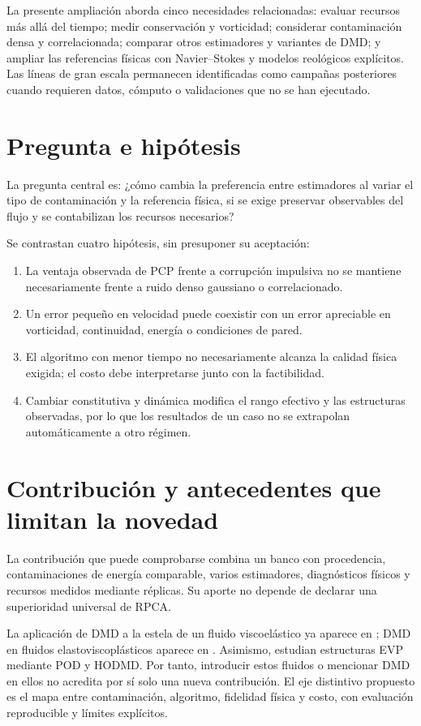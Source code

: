 \documentclass[11pt,oneside,openany]{book}
\begin{document}
La presente ampliación aborda cinco necesidades relacionadas: evaluar
recursos más allá del tiempo; medir conservación y vorticidad; considerar
contaminación densa y correlacionada; comparar otros estimadores y variantes
de DMD; y ampliar las referencias físicas con Navier--Stokes y modelos
reológicos explícitos. Las líneas de gran escala permanecen identificadas
como campañas posteriores cuando requieren datos, cómputo o validaciones
que no se han ejecutado.

\section{Pregunta e hipótesis}
La pregunta central es: ¿cómo cambia la preferencia entre estimadores al
variar el tipo de contaminación y la referencia física, si se exige preservar
observables del flujo y se contabilizan los recursos necesarios?

Se contrastan cuatro hipótesis, sin presuponer su aceptación:
\begin{enumerate}
\item La ventaja observada de PCP frente a corrupción impulsiva no se
      mantiene necesariamente frente a ruido denso gaussiano o correlacionado.
\item Un error pequeño en velocidad puede coexistir con un error apreciable
      en vorticidad, continuidad, energía o condiciones de pared.
\item El algoritmo con menor tiempo no necesariamente alcanza la calidad
      física exigida; el costo debe interpretarse junto con la factibilidad.
\item Cambiar constitutiva y dinámica modifica el rango efectivo y las
      estructuras observadas, por lo que los resultados de un caso no se
      extrapolan automáticamente a otro régimen.
\end{enumerate}

\section{Contribución y antecedentes que limitan la novedad}
La contribución que puede comprobarse combina un banco con procedencia,
contaminaciones de energía comparable, varios estimadores, diagnósticos
físicos y recursos medidos mediante réplicas. Su aporte no depende de
declarar una superioridad universal de RPCA.

La aplicación de DMD a la estela de un fluido viscoelástico ya aparece en
\citet{hamid2022wake}; DMD en fluidos elastoviscoplásticos aparece en
\citet{raffi2024evp}. Asimismo, \citet{corrochano2026evp} estudian estructuras
EVP mediante POD y HODMD. Por tanto, introducir estos fluidos o mencionar
DMD en ellos no acredita por sí solo una nueva contribución. El eje
distintivo propuesto es el mapa entre contaminación, algoritmo, fidelidad
física y costo, con evaluación reproducible y límites explícitos.
\end{document}
